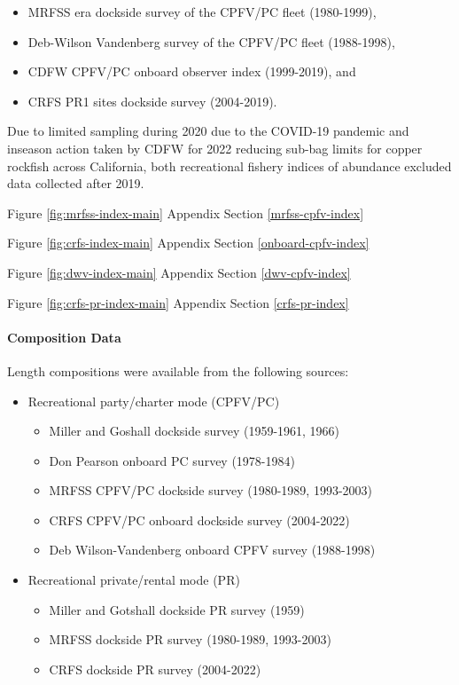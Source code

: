 \documentclass[11pt,
  english,
  letterpaper,
]{article}
\providecommand{\tightlist}{%
  \setlength{\itemsep}{0pt}\setlength{\parskip}{0pt}}
\providecommand{\tightlist}{%
  \setlength{\itemsep}{0pt}\setlength{\parskip}{0pt}}
\begin{document}
\begin{itemize}
\tightlist
\item
  MRFSS era dockside survey of the CPFV/PC fleet (1980-1999),
\item
  Deb-Wilson Vandenberg survey of the CPFV/PC fleet (1988-1998),
\item
  CDFW CPFV/PC onboard observer index (1999-2019), and
\item
  CRFS PR1 sites dockside survey (2004-2019).
\end{itemize}

Due to limited sampling during 2020 due to the COVID-19 pandemic and inseason action taken by CDFW for 2022 reducing sub-bag limits for copper rockfish across California, both recreational fishery indices of abundance excluded data collected after 2019.

Figure \ref{fig:mrfss-index-main} Appendix Section \ref{mrfss-cpfv-index}

Figure \ref{fig:crfs-index-main} Appendix Section \ref{onboard-cpfv-index}

Figure \ref{fig:dwv-index-main} Appendix Section \ref{dwv-cpfv-index}

Figure \ref{fig:crfs-pr-index-main} Appendix Section \ref{crfs-pr-index}

\hypertarget{composition-data-1}{%
\paragraph{Composition Data}\label{composition-data-1}}

Length compositions were available from the following sources:

\begin{itemize}
\item
  Recreational party/charter mode (CPFV/PC)

  \begin{itemize}
  \tightlist
  \item
    Miller and Goshall dockside survey (1959-1961, 1966)
  \item
    Don Pearson onboard PC survey (1978-1984)
  \item
    MRFSS CPFV/PC dockside survey (1980-1989, 1993-2003)
  \item
    CRFS CPFV/PC onboard dockside survey (2004-2022)
  \item
    Deb Wilson-Vandenberg onboard CPFV survey (1988-1998)
  \end{itemize}
\item
  Recreational private/rental mode (PR)

  \begin{itemize}
  \tightlist
  \item
    Miller and Gotshall dockside PR survey (1959)
  \item
    MRFSS dockside PR survey (1980-1989, 1993-2003)
  \item
    CRFS dockside PR survey (2004-2022)
  \end{itemize}
\end{itemize}
\end{document}
